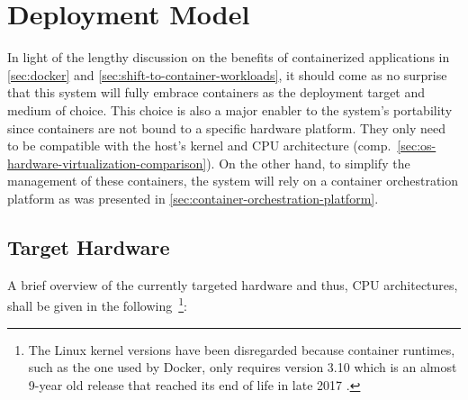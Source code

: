 \section{Deployment Model}
\label{sec:deployment-model}

In light of the lengthy discussion on the benefits of containerized applications in \autoref{sec:docker} and \autoref{sec:shift-to-container-workloads}, it should come as no surprise that this system will fully embrace containers as the deployment target and medium of choice. This choice is also a major enabler to the system's portability since containers are not bound to a specific hardware platform. They only need to be compatible with the host's kernel and \acs{CPU} architecture (comp.~\autoref{sec:os-hardware-virtualization-comparison}). On the other hand, to simplify the management of these containers, the system will rely on a container orchestration platform as was presented in \autoref{sec:container-orchestration-platform}.


\subsection{Target Hardware}
\label{sec:deployment-target-hardware}

A brief overview of the currently targeted hardware and thus, \acs{CPU} architectures, shall be given in the following~\footnote{The Linux kernel versions have been disregarded because container runtimes, such as the one used by Docker, only requires version 3.10 which is an almost 9-year old release that reached its end of life in late 2017 \cite{dockerEngine} \cite{lkml2018eol}.}:

